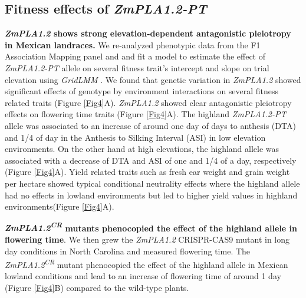 \documentclass[9pt,twocolumn,twoside,lineno]{BioRxiv}
\begin{document}
\subsection{Fitness effects of \textit{ZmPLA1.2-PT}}
\textbf{\textit{ZmPLA1.2} shows strong elevation-dependent antagonistic pleiotropy in Mexican landraces.} 
We re-analyzed phenotypic data from the F1 Association Mapping panel \cite{Romero_Navarro2017-cn} and \cite{Gates2019-xu} and fit a model to estimate the effect of \textit{ZmPLA1.2-PT} allele on several fitness trait's intercept and slope on trial elevation using \textit{GridLMM} \cite{Runcie2019-Gr}. 
We found that genetic variation in \textit{ZmPLA1.2} showed significant effects of genotype by environment interactions on several fitness related traits (Figure \ref{Fig4}A). 
\textit{ZmPLA1.2} showed clear antagonistic pleiotropy effects on flowering time traits (Figure \ref{Fig4}A). 
The highland \textit{ZmPLA1.2-PT} allele was associated to an increase of around one day of days to anthesis (DTA)  and 1/4 of day in the  Anthesis to Silking Interval (ASI) in low elevation environments. 
On the other hand at high elevations, the highland allele was associated with a decrease of DTA and ASI of one and 1/4 of a day, respectively (Figure \ref{Fig4}A).
Yield related traits such as fresh ear weight and grain weight per hectare showed typical conditional neutrality effects where the highland allele had no effects in lowland environments but led to higher yield values in highland environments(Figure \ref{Fig4}A).

\textbf{\textit{ZmPLA1.2\textsuperscript{CR}} mutants phenocopied the effect of the highland allele in flowering time}.
We then grew the \textit{ZmPLA1.2} CRISPR-CAS9 mutant in long day conditions in North Carolina and measured flowering time. 
The \textit{ZmPLA1.2\textsuperscript{CR}} mutant phenocopied the effect of the highland allele in Mexican lowland conditions and lead to an increase of flowering time of around 1 day (Figure \ref{Fig4}B) compared to the wild-type plants. 
\end{document}
